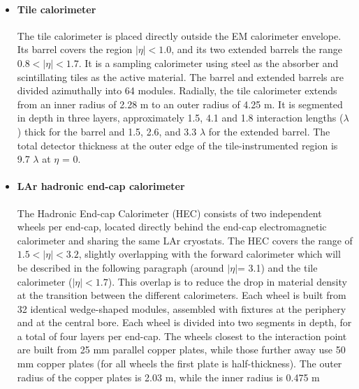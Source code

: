 \documentclass[letterpaper,12pt]{article}
\begin{document}
\begin{itemize}
		\item \paragraph{Tile calorimeter}
		The tile calorimeter is placed directly outside the EM calorimeter envelope. 
		Its	barrel covers the region $|\eta|< 1.0$, and its two extended barrels 
		the range $0.8 < |\eta|< 1.7$. It is a
		sampling calorimeter using steel as the absorber and scintillating tiles 
		as the active material. The	barrel and extended barrels are divided azimuthally 
		into 64 modules. Radially, the tile calorimeter
		extends from an inner radius of 2.28 m to an outer radius of 4.25 m. 
		It is segmented in depth in three
		layers, approximately 1.5, 4.1 and 1.8 interaction lengths ($\lambda$ ) 
		thick for the barrel and 1.5, 2.6, and
		3.3 $\lambda$ for the extended barrel. 
		The total detector thickness at the outer edge of the tile-instrumented
		region is 9.7 $\lambda$ at $\eta$ = 0. 
		\item \paragraph{LAr hadronic end-cap calorimeter}
		The Hadronic End-cap Calorimeter (HEC) consists of two
		independent wheels per end-cap, located directly behind the end-cap 
		electromagnetic calorimeter
		and sharing the same LAr cryostats. 
		The HEC covers the range of $1.5< |\eta|< 3.2$, 
		slightly overlapping with the forward calorimeter which 
		will be described in the following paragraph 
		(around $|\eta|$= 3.1) and the tile calorimeter ($|\eta|< 1.7$).
		This overlap is to reduce the drop in material 
		density at the transition between
		the different calorimeters.
		Each wheel is built from 32
		identical wedge-shaped modules, assembled with fixtures at the periphery 
		and at the central bore.
		Each wheel is divided into two segments in depth, for a total of four 
		layers per end-cap. The wheels
		closest to the interaction point are built from 25 mm parallel copper plates, 
		while those further away
		use 50 mm copper plates (for all wheels the first plate is half-thickness). 
		The outer radius of the
		copper plates is 2.03 m, while the inner radius is 0.475 m 

\end{itemize}
\end{document}
